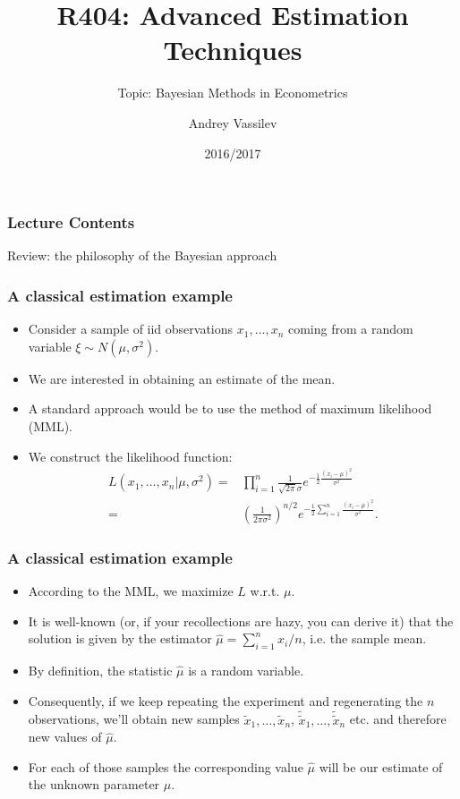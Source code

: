 \documentclass[10pt]{beamer}
\title{R404: Advanced Estimation Techniques}
\subtitle{Topic: Bayesian Methods in Econometrics}
\author{Andrey Vassilev}
\date{2016/2017}
\theoremstyle{definition}
\begin{document}
\maketitle



\begin{frame}[fragile]
\frametitle{Lecture Contents}
\tableofcontents
\end{frame}

\begin{section}{Review: the philosophy of the Bayesian approach}\label{sec:BayesPhil}

\begin{frame}
\frametitle{A classical estimation example}
\begin{itemize}\itemsep1em
\item Consider a sample of iid observations $x_1,\ldots,x_n$ coming from a random variable $\xi \sim N(\mu,\sigma^2)$.
\item We are interested in obtaining an estimate of the mean.
\item A standard approach would be to use the method of maximum likelihood (MML).
\item We construct the likelihood function:
\begin{equation}
\label{eq:NormLik}
\begin{split}
L(x_1,\ldots,x_n|\mu,\sigma^2)= & \prod_{i=1}^{n}\frac{1}{\sqrt{2\pi}\sigma}e^{-\frac{1}{2}\frac{(x_i-\mu)^2}{\sigma^2}}\\
= & \left(
\frac{1}{2\pi\sigma^2}
\right)^{n/2}e^{-\frac{1}{2}\sum_{i=1}^{n}\frac{(x_i-\mu)^2}{\sigma^2}}.
\end{split}
\end{equation}
\end{itemize}
\end{frame}

\begin{frame}
\frametitle{A classical estimation example}
\begin{itemize}\itemsep1em
\item According to the MML, we maximize $ L $ w.r.t. $ \mu $.
\item It is well-known (or, if your recollections are hazy, you can derive it) that the solution is given by the estimator $\hat{\mu}=\sum_{i=1}^{n}x_i/n$, i.e. the sample mean.
\item By definition, the statistic $\hat{\mu}$ is a random variable.
\item Consequently, if we keep repeating the experiment and regenerating the $ n $ observations, we'll obtain new samples $\tilde{x}_1,\ldots,\tilde{x}_n$,  $\tilde{\tilde{x}}_1,\ldots,\tilde{\tilde{x}}_n$ etc. and therefore new values of $\hat{\mu}$.
\item For each of those samples the corresponding value $\hat{\mu}$ will be our estimate of the unknown parameter $ \mu $.
\end{itemize}
\end{frame}


\end{section}
\end{document}
